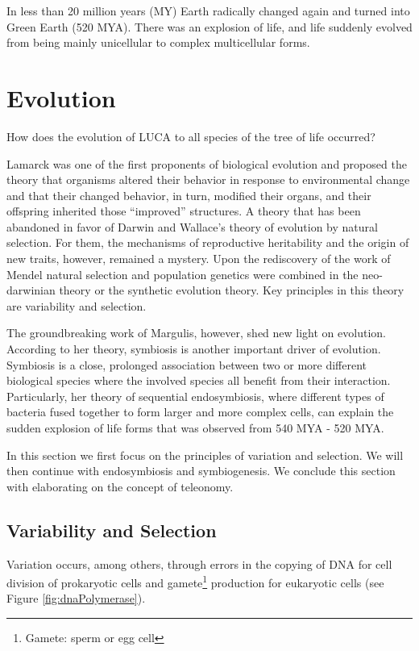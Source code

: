 \documentclass[
  11pt,
]{book}
\begin{document}
In less than 20 million years (MY) Earth radically changed again and turned into Green Earth (520 MYA). There was an explosion of life, and life suddenly evolved from being mainly unicellular to complex multicellular forms.

\hypertarget{evolution}{%
\section{Evolution}\label{evolution}}

How does the evolution of LUCA to all species of the tree of life occurred?

Lamarck was one of the first proponents of biological evolution and proposed the theory that organisms altered their behavior in response to environmental change and that their changed behavior, in turn, modified their organs, and their offspring inherited those ``improved'' structures. A theory that has been abandoned in favor of Darwin and Wallace's theory of evolution by natural selection. For them, the mechanisms of reproductive heritability and the origin of new traits, however, remained a mystery. Upon the rediscovery of the work of Mendel natural selection and population genetics were combined in the neo-darwinian theory or the synthetic evolution theory. Key principles in this theory are variability and selection.

The groundbreaking work of Margulis, however, shed new light on evolution. According to her theory, symbiosis is another important driver of evolution. Symbiosis is a close, prolonged association between two or more different biological species where the involved species all benefit from their interaction. Particularly, her theory of sequential endosymbiosis, where different types of bacteria fused together to form larger and more complex cells, can explain the sudden explosion of life forms that was observed from 540 MYA - 520 MYA.

In this section we first focus on the principles of variation and selection. We will then continue with endosymbiosis and symbiogenesis. We conclude this section with elaborating on the concept of teleonomy.

\hypertarget{variability-and-selection}{%
\subsection{Variability and Selection}\label{variability-and-selection}}

Variation occurs, among others, through errors in the copying of DNA for cell division of prokaryotic cells and gamete\footnote{Gamete: sperm or egg cell} production for eukaryotic cells (see Figure \ref{fig:dnaPolymerase}).
\end{document}

